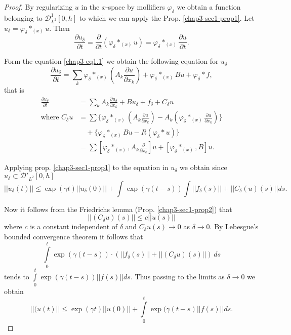 \begin{proof}%
By regularizing $u$ in the $x$-space by mollifiers $\varphi_\delta$ we
obtain a function belonging to $\mathscr{D}^1_{L^2} [0, h]$ to which
we can apply the Prop. \ref{chap3-sec1-prop1}. Let $u_\delta =
\varphi_\delta *_{(x)} u$. Then  
$$
\frac{\partial u_\delta}{\partial t} = \frac{\partial}{\partial t} 
(\varphi _\delta *_{(x)} u) = \varphi_\delta *_{(x)} \frac{\partial
  u}{\partial t}. 
$$

Form the equation \eqref{chap3-eq1.1} we obtain the following equation
for $u_\delta$ 
$$
\frac{\partial u_\delta}{\partial t} = \sum\limits_{k} \varphi_\delta
*_{(x)} \left(A_k \frac{\partial u}{\partial x_k}\right) 
+ \varphi_\delta *_{(x)} Bu +
\varphi_\delta * f,  
$$
that is 
\begin{align*}
\frac{\partial u_\delta}{\partial t} & = \sum\limits_{k} A_k
\frac{\partial u_\delta}{\partial x_k} + Bu_\delta + f_\delta +
C_\delta u\\ 
\text{where } C_\delta u & = \sum \bigg\{ \varphi_\delta *_{(x)}
(A_k \frac{\partial u}{\partial x_k}) - A_k (\varphi _\delta *_{(x)}
\frac{\partial u}{\partial x_k}) \bigg\}\\
&\quad + \bigg\{  \varphi_\delta
*_{(x)} Bu-R (\varphi_\delta * u)\bigg\}\\ 
& = \sum  \left[ \varphi_\delta *_{(x)}, A_k \frac{\partial}{\partial
    x_k}\right] u + \left[\varphi_\delta *_{(x)}, B\right] u. 
\end{align*}

Applying prop. \ref{chap3-sec1-prop1} to the equation in $u_\delta$ we
obtain since $u_\delta \subset \mathscr{D}'_{L^2} [0,h] $
$$
|| u_\delta (t) || \leq
\exp (\gamma t ) || u_\delta (0) || + \int \exp (\gamma (t-s)) \int ||
f_\delta (s) || + || C_\delta (u) (s)|| ds. 
$$\pageoriginale

Now it follows from the Friedrichs lemma (Prop. \ref{chap3-sec1-prop2}) that
$$
|| (C_\delta u) (s) || \leq c || u (s) || 
$$ 
where $c$ is a constant independent of $\delta$ and $C_\delta u(s) \to
0$ as $\delta\to 0$. By Lebesgue's bounded convergence theorem it
follows that   
$$
\int\limits^{t}_{0} \exp (\gamma (t-s))\cdot (|| f_\delta (s)|| + ||
(C_\delta u) (s) ||) \, ds  
$$
tends to $\int\limits^{t}_{0} \exp (\gamma (t-s)) || f(s) ||ds$. Thus
passing to the limits as $\delta \to 0$ we obtain 
$$
||(u (t) || \leq \exp (\gamma t ) || u(0) || + \int\limits^{t}_{0}
\exp (\gamma (t-s) || f (s) || ds. 
$$
\end{proof}

